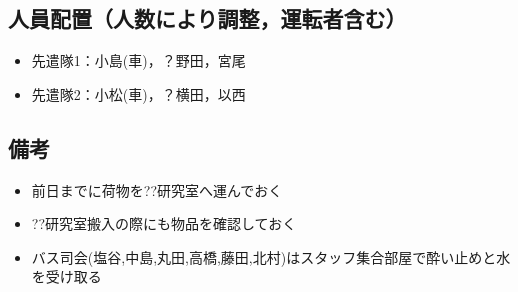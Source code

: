 \subsection{人員配置（人数により調整，運転者含む）}
\begin{itemize}
\item 先遣隊1：小島(車)，？野田，宮尾
\item 先遣隊2：小松(車)，？横田，以西
\end{itemize}


\subsection{備考}
\begin{itemize}
\item 前日までに荷物を??研究室へ運んでおく
\item ??研究室搬入の際にも物品を確認しておく
\item バス司会(塩谷,中島,丸田,高橋,藤田,北村)はスタッフ集合部屋で酔い止めと水を受け取る
\end{itemize}



%
